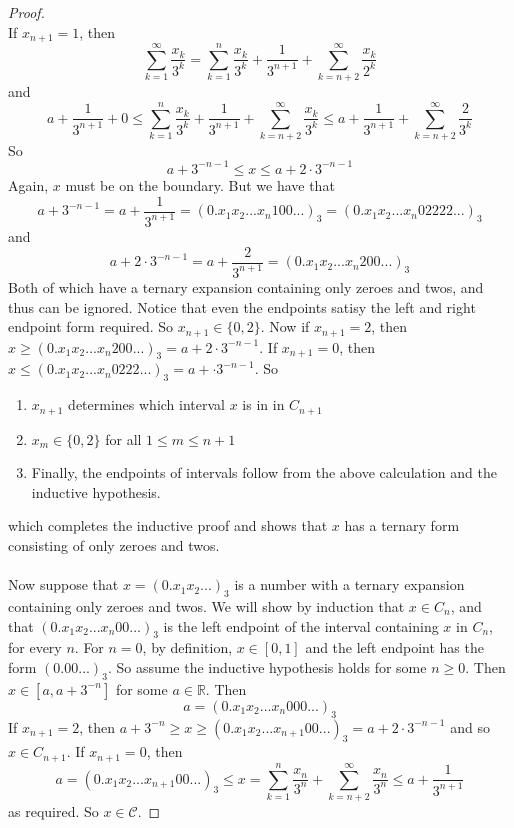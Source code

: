 \documentclass{article}
\theoremstyle{plain}
\theoremstyle{definition}
\theoremstyle{remark}
\begin{document}
\begin{proof}
\[\]
If $x_{n+1} = 1$, then \[
  \sum \limits _{k=1}^{\infty } \frac{x_k}{3^k}  = \sum \limits _{k=1}^{n} \frac{x_k}{3^k} + \frac{1}{3^{n+1}} + \sum \limits _{k=n+2}^{\infty} \frac{x_k}{2^k}
\]
and \[
a  + \frac{1}{3^{n+1}} + 0\le \sum \limits _{k=1}^{n} \frac{x_k}{3^k} + \frac{1}{3^{n+1}} + \sum \limits _{k=n+2}^{\infty} \frac{x_k}{3^k} \le a + \frac{1}{3^{n+1}} + \sum \limits _{k = n+2}^{\infty } \frac{2}{3^k}
\]
So \[
a + 3^{-n-1} \le x \le a+2\cdot 3^{-n-1}
\]
Again, $x$ must be on the boundary. But we have that \[
a + 3^{-n-1} = a+ \frac{1}{3^{n+1}} = (0.x_1x_2...x_n100...)_3 = (0.x_1x_2...x_n02222...)_3
\]
and 
\[
a + 2 \cdot 3^{-n-1} = a+ \frac{2}{3^{n+1}} = (0.x_1x_2...x_n200...)_3 
\]
Both of which have a ternary expansion containing only zeroes and twos, and thus can be ignored. Notice that even the endpoints satisy the left and right endpoint form required. So $x_{n+1} \in \{0,2\}$. Now if $x_{n+1} = 2$, then $x \ge (0.x_1x_2...x_{n}200...)_3 = a + 2 \cdot 3^{-n-1}$. If $x_{n+1} = 0$, then $x \le (0.x_1x_2...x_n0222...)_3 = a + \cdot 3^{-n-1}$. So
\begin{enumerate}
    \item $x_{n+1}$ determines which interval $x$ is in in $C_{n+1}$
    \item $x_{m} \in \{0,2\}$ for all $1 \le m \le n+1$
    \item Finally, the endpoints of intervals follow from the above calculation and the inductive hypothesis.
\end{enumerate}
which completes the inductive proof and shows that $x$ has a ternary form consisting of only zeroes and twos.
~\\ ~\\Now suppose that $x = (0.x_1x_2...)_3$ is a number with a ternary expansion containing only zeroes and twos. We will show by induction that $x \in C_n$, and that $(0.x_1x_2...x_n00...)_3$ is the left endpoint of the interval containing $x$ in $C_n$, for every $n$. For $n=0$, by definition, $x \in [0,1]$ and the left endpoint has the form $(0.00...)_3$. So assume the inductive hypothesis holds for some $n \ge 0$. Then $x \in [a, a+3^{-n}]$ for some $a \in \mathbb{R}$. Then \[
a = (0.x_1x_2...x_n000...)_3 
\]
If $x_{n+1} = 2$, then $a + 3^{-n} \ge x \ge (0.x_1x_2...x_{n+1}00...)_3 = a+2 \cdot 3^{-n-1}$ and so $x \in C_{n+1}$. If $x_{n+1} = 0$, then \[
a = (0.x_1x_2...x_{n+1}00...)_3\le x = \sum \limits _{k=1}^{n} \frac{x_n}{3^n} + \sum \limits _{k=n+2}^\infty \frac{x_n}{3^n} \le a + \frac{1}{3^{n+1}}
\]
as required. So $x \in \mathcal{C}$.

\end{proof}
\end{document}
